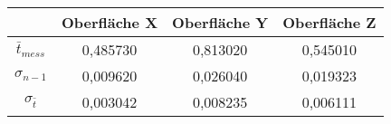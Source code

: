 \begin{tabular}{c|c|c|c}
    \space & Oberfläche X & Oberfläche Y & Oberfläche Z \\ \hline
    $\bar{t}_{mess}$ & 0,485730 & 0,813020 & 0,545010 \\
    $\sigma_{n-1}$ & 0,009620 & 0,026040 & 0,019323 \\
    $\sigma_{\bar{t}}$ & 0,003042 & 0,008235 & 0,006111 
\end{tabular}